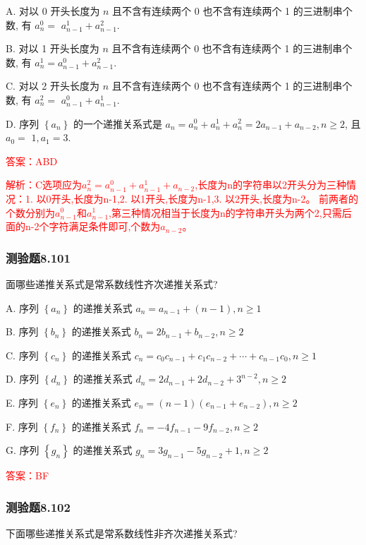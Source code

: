 \documentclass[UTF8, heading=true]{ctexart}
\begin{document}
A. 
对以 0 开头长度为 $n$ 且不含有连续两个 0 也不含有连续两个 1 的三进制串个数, 有 $a_n^0=$ $a_{n-1}^1+a_{n-1}^2$.

B. 对以 1 开头长度为 $n$ 且不含有连续两个 0 也不含有连续两个 1 的三进制串个数, 有 $a_n^1=a_{n-1}^0+a_{n-1}^2$.

C. 对以 2 开头长度为 $n$ 且不含有连续两个 0 也不含有连续两个 1 的三进制串个数, 有 $a_n^2=$ $a_{n-1}^0+a_{n-1}^1$.

D. 序列 $\left\{a_n\right\}$ 的一个递推关系式是 $a_n=a_n^0+a_n^1+a_n^2=2 a_{n-1}+a_{n-2}, n \geq 2$, 且 $a_0=$ $1, a_1=3$.

\textcolor{red}{答案：ABD}

\textcolor{red}{解析：C选项应为$a_n^2=a_{n-1}^0+a_{n-1}^1+a_{n-2}$,长度为n的字符串以2开头分为三种情况：1. 以0开头,长度为n-1,2. 以1开头,长度为n-1,3. 以2开头,长度为n-2。
前两者的个数分别为$a_{n-1}^0$和$a_{n-1}^1$,第三种情况相当于长度为n的字符串开头为两个2,只需后面的n-2个字符满足条件即可,个数为$a_{n-2}$。
}

\subsubsection{测验题8.101}

面哪些递推关系式是常系数线性齐次递推关系式?

A. 序列 $\left\{a_n\right\}$ 的递推关系式 $a_n=a_{n-1}+(n-1),  n \geq 1$

B. 序列 $\left\{b_n\right\}$ 的递推关系式 $b_n=2 b_{n-1}+b_{n-2},  n \geq 2$

C. 序列 $\left\{c_n\right\}$ 的递推关系式 $c_n=c_0 c_{n-1}+c_1 c_{n-2}+\cdots+c_{n-1} c_0,  n \geq 1$

D. 序列 $\left\{d_n\right\}$ 的递推关系式 $d_n=2 d_{n-1}+2 d_{n-2}+3^{n-2},  n \geq 2$

E. 序列 $\left\{e_n\right\}$ 的递推关系式 $e_n=(n-1)\left(e_{n-1}+e_{n-2}\right),  n \geq 2$

F. 序列 $\left\{f_n\right\}$ 的递推关系式 $f_n=-4 f_{n-1}-9 f_{n-2},  n \geq 2$

G. 序列 $\left\{g_n\right\}$ 的递推关系式 $g_n=3 g_{n-1}-5 g_{n-2}+1, n \geq 2$

\textcolor{red}{答案：BF}

\subsubsection{测验题8.102}

下面哪些递推关系式是常系数线性非齐次递推关系式?
\end{document}
